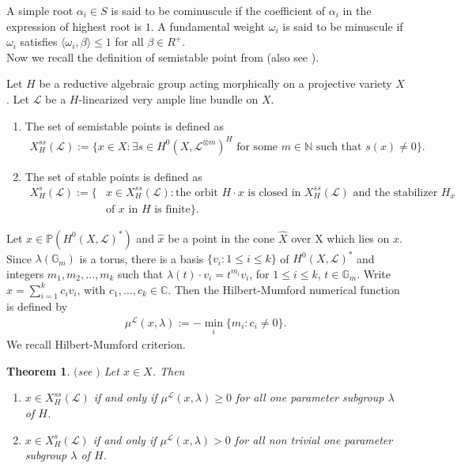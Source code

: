 \documentclass[12pt,reqno]{amsart}
\numberwithin{equation}{section}
\newtheorem{theorem}{Theorem}[section]
\theoremstyle{definition}
\begin{document}
A simple root $\alpha_{i}\in S$ is said to be cominuscule if the coefficient of $\alpha_{i}$ in the expression of highest root is $1$. A fundamental weight $\omega_{i}$ is said to be minuscule if $\omega_{i}$ satisfies $\langle\omega_{i},\beta\rangle\leq 1$ for all $\beta\in R^{+}$.\\
Now we recall the definition of semistable point from \cite{GIT}(also see \cite{NEWSTEAD}).

Let $H$ be a reductive algebraic group acting morphically on a projective variety $X$. Let $\mathcal{L}$ be a $H$-linearized very ample line bundle on $X$.
\begin{enumerate}
	\item The set of semistable points  is defined as
	\begin{align*}
		X^{ss}_{H}(\mathcal{L}):=\{x\in X:\exists s\in H^{0}(X,\mathcal{L}^{\otimes m})^{H} \text{ for some $m\in\mathbb{N}$ such that } s(x)\neq 0\}.
	\end{align*}
\item  The set of stable points is defined as
\begin{align*}
	X^{s}_{H}(\mathcal{L}):=\{&x\in 	X^{ss}_{H}(\mathcal{L}): \text{the orbit $H\cdot x$ is closed in 	$X^{ss}_{H}(\mathcal{L})$ and the stabilizer $H_{x}$}\\&  \text{of $x$ in $H$ is finite}\}.
\end{align*}
\end{enumerate}
 Let $x\in \mathbb{P}(H^{0}(X,\mathcal{L})^{*})$ and $\hat{x}$ be a point in the cone $\hat{X}$ over X which lies on $x$. Since $\lambda(\mathbb{G}_{m})$ is a torus, there is a basis  $\{v_{i}: 1\leq i\leq k\}$ of $H^{0}(X,\mathcal{L})^{*}$ and integers $m_{1},m_{2},\ldots,m_{k}$ such that 
$\lambda(t)\cdot v_{i}=t^{m_{i}}v_{i}$, for $1\leq i\leq k$, $t\in \mathbb{G}_{m}$.
Write $\hat{x}=\displaystyle\sum_{i=1}^{k}c_{i}v_{i}$, with $c_{1},\ldots,c_{k}\in\mathbb{C}$. Then the Hilbert-Mumford numerical function is defined by \begin{align*}
	\mu^{\mathcal{L}}(x,\lambda):= -\displaystyle \min_{i}\{m_{i}: c_{i}\neq 0\}.
\end{align*}We recall Hilbert-Mumford criterion.
\begin{theorem}$($see \cite[Theorem 2.1]{GIT}$)$ Let $x\in X$. Then 
\begin{enumerate}
	\item $x\in X^{ss}_{H}(\mathcal{L})$ if and only if $\mu^{\mathcal{L}}(x,\lambda)\geq 0$ for all one parameter subgroup $\lambda$ of $H$.
	\item $x\in X^{s}_{H}(\mathcal{L})$ if and only if $\mu^{\mathcal{L}}(x,\lambda)> 0$ for all non trivial one parameter subgroup $\lambda$ of $H$. 
\end{enumerate}
\label{HM theprem for G}
\end{theorem}
\end{document}
